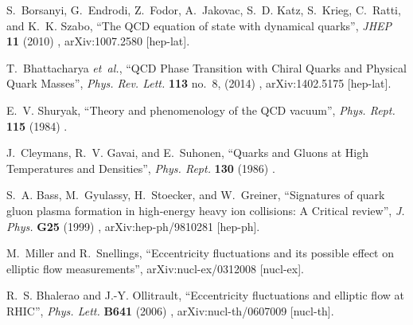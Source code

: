 \documentclass[ALICE,manyauthors]{cernphprep}
\begin{document}
\providecommand{\href}[2]{#2}\begingroup\raggedright\begin{thebibliography}{10}

S.~Borsanyi, G.~Endrodi, Z.~Fodor, A.~Jakovac, S.~D. Katz, S.~Krieg, C.~Ratti,
  and K.~K. Szabo, ``{The QCD equation of state with dynamical quarks}'',
  \href{http://dx.doi.org/10.1007/JHEP11(2010)077}{{\em JHEP} {\bfseries 11}
  (2010) },
\href{http://arxiv.org/abs/1007.2580}{{\ttfamily arXiv:1007.2580 [hep-lat]}}.

T.~Bhattacharya {\em et~al.}, ``{QCD Phase Transition with Chiral Quarks and
  Physical Quark Masses}'',
  \href{http://dx.doi.org/10.1103/PhysRevLett.113.082001}{{\em Phys. Rev.
  Lett.} {\bfseries 113} no.~8, (2014) },
\href{http://arxiv.org/abs/1402.5175}{{\ttfamily arXiv:1402.5175 [hep-lat]}}.

E.~V. Shuryak, ``{Theory and phenomenology of the QCD vacuum}'',
\href{http://dx.doi.org/10.1016/0370-1573(84)90037-1}{{\em Phys. Rept.}
  {\bfseries 115} (1984) }.

J.~Cleymans, R.~V. Gavai, and E.~Suhonen, ``{Quarks and Gluons at High
  Temperatures and Densities}'',
\href{http://dx.doi.org/10.1016/0370-1573(86)90169-9}{{\em Phys. Rept.}
  {\bfseries 130} (1986) }.

S.~A. Bass, M.~Gyulassy, H.~Stoecker, and W.~Greiner, ``{Signatures of quark
  gluon plasma formation in high-energy heavy ion collisions: A Critical
  review}'', \href{http://dx.doi.org/10.1088/0954-3899/25/3/013}{{\em J. Phys.}
  {\bfseries G25} (1999) },
\href{http://arxiv.org/abs/hep-ph/9810281}{{\ttfamily arXiv:hep-ph/9810281
  [hep-ph]}}.

M.~Miller and R.~Snellings, ``{Eccentricity fluctuations and its possible
  effect on elliptic flow measurements}'',
\href{http://arxiv.org/abs/nucl-ex/0312008}{{\ttfamily arXiv:nucl-ex/0312008
  [nucl-ex]}}.

R.~S. Bhalerao and J.-Y. Ollitrault, ``{Eccentricity fluctuations and elliptic
  flow at RHIC}'', \href{http://dx.doi.org/10.1016/j.physletb.2006.08.055}{{\em
  Phys. Lett.} {\bfseries B641} (2006) },
\href{http://arxiv.org/abs/nucl-th/0607009}{{\ttfamily arXiv:nucl-th/0607009
  [nucl-th]}}.


\end{thebibliography}
\end{document}
